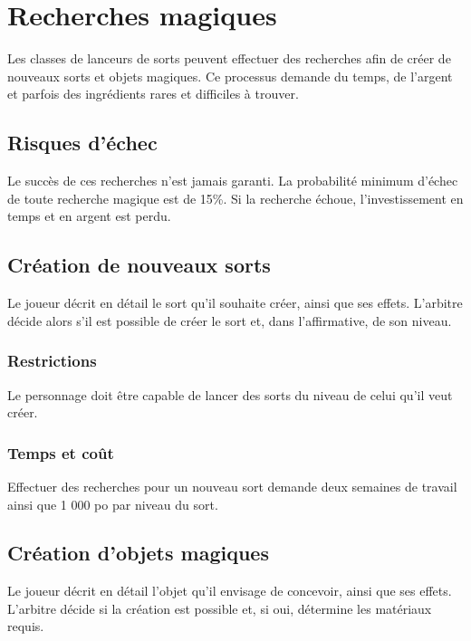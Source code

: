 \section{Recherches magiques}\label{recherches-magiques}

Les classes de lanceurs de sorts peuvent effectuer des recherches afin
de créer de nouveaux sorts et objets magiques. Ce processus demande du
temps, de l'argent et parfois des ingrédients rares et difficiles à
trouver.

\subsection{Risques d'échec}\label{risques-duxe9chec}

Le succès de ces recherches n'est jamais garanti. La probabilité minimum
d'échec de toute recherche magique est de 15\%. Si la recherche échoue,
l'investissement en temps et en argent est perdu.

\subsection{Création de nouveaux sorts}\label{cruxe9ation-de-nouveaux-sorts}

Le joueur décrit en détail le sort qu'il souhaite créer, ainsi que ses
effets. L'arbitre décide alors s'il est possible de créer le sort et,
dans l'affirmative, de son niveau.

\subsubsection{Restrictions}\label{restrictions}

Le personnage doit être capable de lancer des sorts du niveau de celui
qu'il veut créer.

\subsubsection{Temps et coût}\label{temps-et-couxfbt}

Effectuer des recherches pour un nouveau sort demande deux semaines de
travail ainsi que 1 000 po par niveau du sort.

\subsection{Création d'objets magiques}\label{cruxe9ation-dobjets-magiques}

Le joueur décrit en détail l'objet qu'il envisage de concevoir, ainsi
que ses effets. L'arbitre décide si la création est possible et, si oui,
détermine les matériaux requis.

